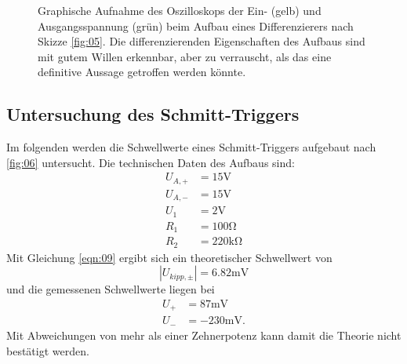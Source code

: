 \begin{figure}
\begin{subfigure}{0.35\textwidth}
  \end{subfigure}
  \caption{Graphische Aufnahme des Oszilloskops der Ein- (gelb) und Ausgangsspannung (grün) beim Aufbau eines Differenzierers nach Skizze \ref{fig:05}. Die differenzierenden Eigenschaften des Aufbaus sind mit gutem Willen erkennbar, aber zu verrauscht, als das eine definitive Aussage getroffen werden könnte.}
  \label{fig:Osz_d}
\end{figure}

\subsection{Untersuchung des Schmitt-Triggers}
Im folgenden werden die Schwellwerte eines Schmitt-Triggers aufgebaut nach \ref{fig:06} untersucht. Die technischen Daten des Aufbaus sind:
\begin{align}
  U_{A,+} &= 15\si{\volt}\\
  U_{A,-} &= 15\si{\volt}\\
  U_{1}   &= 2\si{\volt}\\
  R_{1}   &= 100\si{\ohm}\\
  R_{2}   &= 220\si{\kilo\ohm}  
\end{align}
Mit Gleichung \ref{eqn:09} ergibt sich ein theoretischer Schwellwert von
\begin{equation}
  \left|U_{kipp,\pm}\right| = 6.82\si{\milli\volt}
\end{equation}
und die gemessenen Schwellwerte liegen bei
\begin{align}
  U_+ &= 87 \si{\milli\volt}\\
  U_- &= -230 \si{\milli\volt}.
\end{align}
Mit Abweichungen von mehr als einer Zehnerpotenz kann damit die Theorie nicht bestätigt werden.
